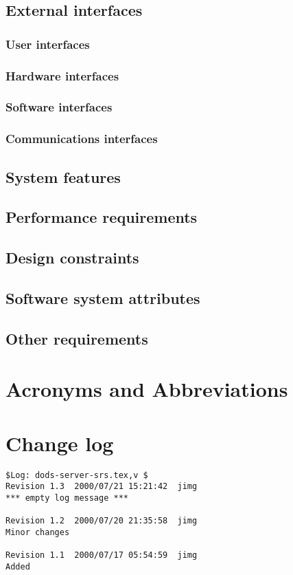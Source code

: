 \documentclass{article}
\begin{document}
\subsection{External interfaces}

\subsubsection{User interfaces}
\subsubsection{Hardware interfaces}
\subsubsection{Software interfaces}
\subsubsection{Communications interfaces}

\subsection{System features}
\subsection{Performance requirements}
\subsection{Design constraints}
\subsection{Software system attributes}
\subsection{Other requirements}

\appendix

\section{Acronyms and Abbreviations}
\begin{acronym}

\end{acronym}

\section{Change log}

\begin{verbatim}
$Log: dods-server-srs.tex,v $
Revision 1.3  2000/07/21 15:21:42  jimg
*** empty log message ***

Revision 1.2  2000/07/20 21:35:58  jimg
Minor changes

Revision 1.1  2000/07/17 05:54:59  jimg
Added

\end{verbatim}


\raggedright


\end{document}
